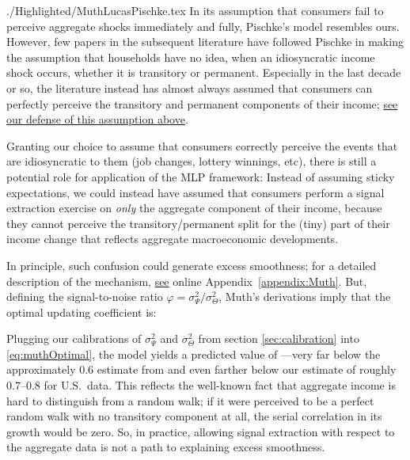\begin{verbatimwrite}{./Highlighted/MuthLucasPischke.tex}
  In its assumption that consumers fail to perceive aggregate shocks immediately and fully, Pischke's model resembles ours.  However, few papers in the subsequent literature have followed Pischke in making the assumption that households have no idea, when an idiosyncratic income shock occurs, whether it is transitory or permanent.  Especially in the last decade or so, the literature instead has almost always assumed that consumers can perfectly perceive the transitory and permanent components of their income; \hyperlink{Why-Consumers-See-Individual-Shocks}{see our defense of this assumption above}.

  Granting our choice to assume that consumers correctly perceive the events that are idiosyncratic to them (job changes, lottery winnings, etc), there is still a potential role for application of the MLP framework:  Instead of assuming sticky expectations, we could instead have assumed that consumers perform a signal extraction exercise on \textit{only} the aggregate component of their income, because they cannot perceive the transitory/permanent split for the (tiny) part of their income change that reflects aggregate macroeconomic developments.

  In principle, such confusion could generate excess smoothness; for a detailed description of the mechanism, \hyperlink{MuthLucasPischke}{see} online Appendix~\ref{appendix:Muth}.  But, defining the signal-to-noise ratio $\varphi=\sigma^2_{\Psi}/\sigma^2_{\Theta}$, Muth's derivations imply that the optimal updating coefficient is:
  
  \providecommand{\PischkePi}{0.83}
  \providecommand{\PischkePiCancel}{0.17}
  \providecommand{\fromFile}{false}
  \providecommand{\FileOrNot}{\ifthenelse{\boolean{\fromFile}}}
  Plugging our calibrations of $\sigma^2_{\Psi}$ and $\sigma^2_{\Theta}$ from section \ref{sec:calibration} into \eqref{eq:muthOptimal}, the model yields a predicted value of \FileOrNot{$1-\Pi \approx \PischkePiCancel$}{$(1-\Pi) \approx \PischkePiCancel $}---very far below the approximately $0.6$ estimate from \cite{hrsHabit} and even farther below our estimate of roughly $0.7$--$0.8$ for U.S.\ data.  This reflects the well-known fact that aggregate income is hard to distinguish from a random walk; if it were perceived to be a perfect random walk with no transitory component at all, the serial correlation in its growth would be zero.  So, in practice, allowing signal extraction with respect to the aggregate data is not a path to explaining excess smoothness.

  \subsection{\cite{reis:inattentive}}


\end{verbatimwrite}
